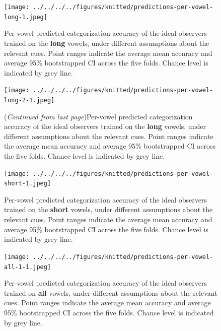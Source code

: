 \documentclass[utf8]{frontiers_suppmat} %
\begin{document}
\begin{landscape}
\begin{figure}[H]

{\centering \texttt{[image: ../../../../figures/knitted/predictions-per-vowel-long-1.jpeg]} 

}
\caption{Per-vowel predicted categorization accuracy of the ideal observers trained on the \textbf{long} vowels, under different assumptions about the relevant cues. Point ranges indicate the average mean accuracy and average 95\% bootstrapped CI across the five folds. Chance level is indicated by grey line.}\label{fig:predictions-per-vowel-long}
\end{figure}
\end{landscape}



\begin{landscape}

\begin{figure}[H]
{\centering \texttt{[image: ../../../../figures/knitted/predictions-per-vowel-long-2-1.jpeg]} 

}

\caption{(\emph{Continued from last page})Per-vowel predicted categorization accuracy of the ideal observers trained on the \textbf{long} vowels, under different assumptions about the relevant cues. Point ranges indicate the average mean accuracy and average 95\% bootstrapped CI across the five folds. Chance level is indicated by grey line.}\label{fig:predictions-per-vowel-long-2}
\end{figure}
\end{landscape}



\begin{figure}[H]

{\centering \texttt{[image: ../../../../figures/knitted/predictions-per-vowel-short-1.jpeg]} 

}

\caption{Per-vowel predicted categorization accuracy of the ideal observers trained on the \textbf{short} vowels, under different assumptions about the relevant cues. Point ranges indicate the average mean accuracy and average 95\% bootstrapped CI across the five folds. Chance level is indicated by grey line.}\label{fig:predictions-per-vowel-short}
\end{figure}



\begin{figure}[H]

{\centering \texttt{[image: ../../../../figures/knitted/predictions-per-vowel-all-1-1.jpeg]} 

}

\caption{Per-vowel predicted categorization accuracy of the ideal observers trained on \textbf{all} vowels, under different assumptions about the relevant cues. Point ranges indicate the average mean accuracy and average 95\% bootstrapped CI across the five folds. Chance level is indicated by grey line.}\label{fig:predictions-per-vowel-all-1}
\end{figure}
\end{document}

